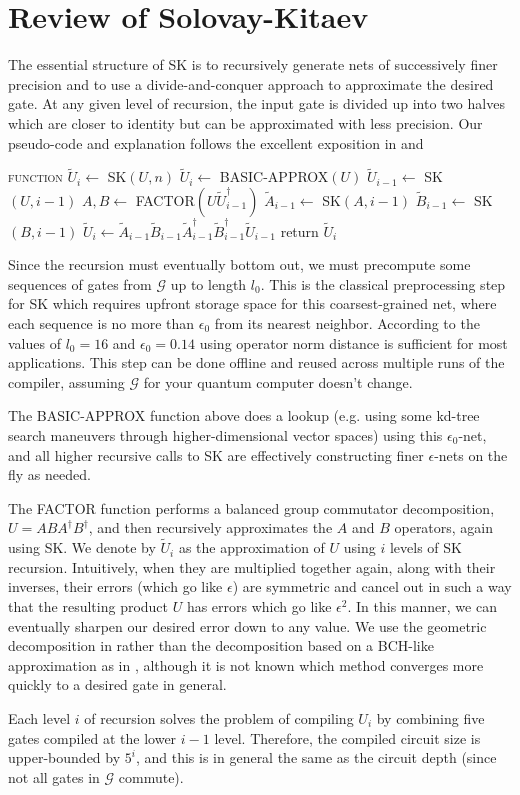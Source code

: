 \section{Review of Solovay-Kitaev}
\label{sec:sk-algo}

The essential structure of SK is to recursively generate nets of
successively finer precision and to use a divide-and-conquer approach to
approximate the desired gate. At any given level of recursion, the input 
gate is divided up into two halves which are closer to identity but can be
approximated with less precision. Our pseudo-code and explanation
follows the excellent exposition in \cite{Dawson2005} and \cite{harrow01}

\begin{algorithmic}[1]
\STATE \textsc{function} $\tilde{U}_i \leftarrow$ SK$(U,n)$
\STATE $\tilde{U}_i \leftarrow $ BASIC-APPROX$(U)$
\ELSE
\STATE $\tilde{U}_{i-1} \leftarrow$ SK$(U, i-1)$
\STATE $A,B \leftarrow $ FACTOR$(U\tilde{U}^\dagger_{i-1})$
\STATE $\tilde{A}_{i-1} \leftarrow $ SK$(A, i-1)$
\STATE $\tilde{B}_{i-1} \leftarrow $ SK$(B, i-1)$
\STATE $\tilde{U}_i \leftarrow \tilde{A}_{i-1}\tilde{B}_{i-1}\tilde{A}^\dagger_{i-1}\tilde{B}^\dagger_{i-1}\tilde{U}_{i-1}$
\ENDIF
\STATE return $\tilde{U}_i$
\end{algorithmic}

Since the recursion must eventually bottom out, we must precompute some sequences
of gates from $\mathcal{G}$ up to length $l_0$. This is the classical
preprocessing step for SK which requires upfront storage space for this
coarsest-grained net, where
each sequence is no more than $\epsilon_0$ from its nearest neighbor. According
to \cite{Dawson2005} the values of $l_0=16$ and $\epsilon_0 = 0.14$ using
operator norm distance is sufficient for most applications.
This step can be
done offline and reused across multiple runs of the compiler, assuming
$\mathcal{G}$ for your quantum computer doesn't change.

The BASIC-APPROX function above does a lookup (e.g. using some kd-tree search
maneuvers through higher-dimensional vector spaces) using this $\epsilon_0$-net,
and all higher recursive calls to SK are effectively constructing
finer $\epsilon$-nets on the fly as needed.

The FACTOR function performs a balanced group commutator decomposition,
$U = ABA^\dagger B^\dagger$, and then recursively approximates the $A$ and $B$
operators, again using SK. We denote by $\tilde{U}_i$ as the approximation
of $U$ using $i$ levels of SK recursion. Intuitively, when they are multiplied
together again, along with their inverses, their errors (which go like
$\epsilon$) are symmetric and cancel out in such a way that the resulting
product $U$ has errors which go like $\epsilon^2$. In this manner, we can
eventually sharpen our desired error down to any value. We use the
geometric decomposition in \cite{Dawson2005} rather than the decomposition
based on a BCH-like approximation as in \cite{harrow01}, although it is not
known which method converges more quickly to a desired gate in general.

Each level $i$ of recursion solves the problem of compiling 
$U_i$ by combining five gates compiled at the lower $i-1$ level.
Therefore, the compiled circuit size is upper-bounded by $5^i$, and
this is in general the same as the circuit depth (since not all gates in
$\mathcal{G}$ commute).
